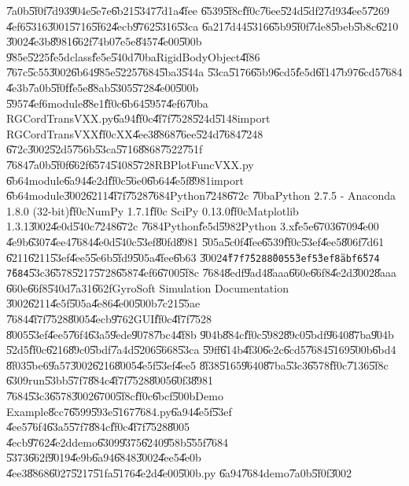 \U{7a0b}\U{5f0f}\U{7d93}\U{904e}\U{5e7e}\U{6b21}\U{5347}\U{7d1a}\U{4fee}%
\U{6539}\U{5f8c}\U{ff0c}\U{76ee}\U{524d}\U{5df2}\U{7d93}\U{4ee5}\U{7269}%
\U{4ef6}\U{5316}\U{3001}\U{5716}\U{5f62}\U{4ecb}\U{9762}\U{5316}\U{53ca}%
\U{6a21}\U{7d44}\U{5316}\U{65b9}\U{5f0f}\U{7de8}\U{5beb}\U{5b8c}\U{6210}%
\U{3002}\U{4e3b}\U{8981}\U{662f}\U{74b0}\U{7e5e}\U{8457}\U{4e00}\U{500b}%
\U{985e}\U{5225}\U{fe5d}class\U{fe5e}\U{540d}\U{70ba}RigidBodyObject\U{4f86}%
\U{767c}\U{5c55}\U{3002}\U{6b64}\U{985e}\U{5225}\U{7684}\U{5ba3}\U{544a}%
\U{53ca}\U{5176}\U{65b9}\U{6cd5}\U{fe5d}\U{6f14}\U{7b97}\U{6cd5}\U{7684}%
\U{4e3b}\U{7a0b}\U{5f0f}\U{fe5e}\U{88ab}\U{5305}\U{5728}\U{4e00}\U{500b}%
\U{5957}\U{4ef6}module\U{88e1}\U{ff0c}\U{6b64}\U{5957}\U{4ef6}\U{70ba}%
RGCordTransVXX.py\U{6a94}\U{ff0c}\U{4f7f}\U{7528}\U{524d}\U{5148}import
RGCordTransVXX\U{ff0c}XX\U{4ee3}\U{8868}\U{76ee}\U{524d}\U{7684}\U{7248}%
\U{672c}\U{3002}\U{52d5}\U{756b}\U{53ca}\U{5716}\U{8868}\U{7522}\U{751f}%
\U{7684}\U{7a0b}\U{5f0f}\U{662f}\U{6574}\U{5408}\U{5728}RBPlotFuncVXX.py%
\U{6b64}module\U{6a94}\U{4e2d}\U{ff0c}\U{56e0}\U{6b64}\U{4e5f}\U{8981}import%
\U{6b64}module\U{3002}\U{6211}\U{4f7f}\U{7528}\U{7684}Python\U{7248}\U{672c}%
\U{70ba}Python 2.7.5 - Anaconda 1.8.0 (32-bit)\U{ff0c}NumPy 1.7.1\U{ff0c}%
SciPy 0.13.0\U{ff0c}Matplotlib 1.3.1\U{3002}\U{4e0d}\U{540c}\U{7248}\U{672c}%
\U{7684}Python\U{fe5d}\U{5982}Python 3.x\U{fe5e}\U{6703}\U{6709}\U{4e00}%
\U{4e9b}\U{6307}\U{4ee4}\U{7684}\U{4e0d}\U{540c}\U{53ef}\U{80fd}\U{8981}%
\U{505a}\U{5c0f}\U{4fee}\U{6539}\U{ff0c}\U{53ef}\U{4ee5}\U{806f}\U{7d61}%
\U{6211}\U{6211}\U{53ef}\U{4ee5}\U{5e6b}\U{5fd9}\U{505a}\U{4fee}\U{6b63}%
\U{3002}\texttt{\U{4f7f}\U{7528}\U{8005}\U{53ef}\U{53ef}\U{8abf}\U{6574}%
\U{7684}}\U{53c3}\U{6578}\U{5217}\U{5728}\U{6587}\U{4ef6}\U{6700}\U{5f8c}%
\U{7684}\U{8edf}\U{9ad4}\U{8aaa}\U{660e}\U{66f8}\U{4e2d}\U{3002}\U{8aaa}%
\U{660e}\U{66f8}\U{540d}\U{7a31}\U{662f}GyroSoft Simulation Documentation%
\U{3002}\U{6211}\U{4e5f}\U{505a}\U{4e86}\U{4e00}\U{500b}\U{7c21}\U{55ae}%
\U{7684}\U{4f7f}\U{7528}\U{8005}\U{4ecb}\U{9762}GUI\U{ff0c}\U{4f7f}\U{7528}%
\U{8005}\U{53ef}\U{4ee5}\U{76f4}\U{63a5}\U{9ede}\U{9078}\U{7bc4}\U{4f8b}%
\U{904b}\U{884c}\U{ff0c}\U{5982}\U{89c0}\U{5bdf}\U{9640}\U{87ba}\U{904b}%
\U{52d5}\U{ff0c}\U{6216}\U{89c0}\U{5bdf}\U{7a4d}\U{5206}\U{5668}\U{53ca}%
\U{59ff}\U{614b}\U{4f30}\U{6e2c}\U{6cd5}\U{7684}\U{5169}\U{500b}\U{6bd4}%
\U{8f03}\U{5be6}\U{9a57}\U{3002}\U{6216}\U{8005}\U{4e5f}\U{53ef}\U{4ee5}%
\U{8f38}\U{5165}\U{9640}\U{87ba}\U{53c3}\U{6578}\U{ff0c}\U{7136}\U{5f8c}%
\U{6309}run\U{53bb}\U{57f7}\U{884c}\U{4f7f}\U{7528}\U{8005}\U{60f3}\U{8981}%
\U{7684}\U{53c3}\U{6578}\U{3002}\U{6700}\U{5f8c}\U{ff0c}\U{6bcf}\U{500b}Demo
Example\U{8cc7}\U{6599}\U{593e}\U{5167}\U{7684}.py\U{6a94}\U{4e5f}\U{53ef}%
\U{4ee5}\U{76f4}\U{63a5}\U{57f7}\U{884c}\U{ff0c}\U{4f7f}\U{7528}\U{8005}%
\U{4ecb}\U{9762}\U{4e2d}demo\U{6309}\U{9375}\U{6240}\U{958b}\U{555f}\U{7684}%
\U{5373}\U{662f}\U{9019}\U{4e9b}\U{6a94}\U{6848}\U{3002}\U{4ee5}\U{4e0b}%
\U{4ee3}\U{8868}\U{6027}\U{5217}\U{51fa}\U{5176}\U{4e2d}\U{4e00}\U{500b}.py%
\U{6a94}\U{7684}demo\U{7a0b}\U{5f0f}\U{3002}

